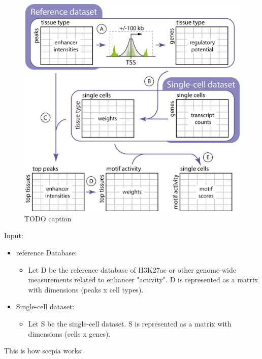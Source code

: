 \begin{figure}
    \centering
    \includegraphics[width=1\linewidth]{ch.scepia/imgs/overview.png}
    \caption{TODO caption}
    \label{fig:enter-label}
\end{figure}

\noindent
Input:

\begin{itemize}
	\item reference Database:
    \begin{itemize}
        \item Let D be the reference database of H3K27ac or other genome-wide measurements related to enhancer "activity". D is represented as a matrix with dimensions (peaks x cell types).
    \end{itemize}
	\item Single-cell dataset:
    \begin{itemize}
        \item Let S be the single-cell dataset. S is represented as a matrix with dimensions (cells x genes).
    \end{itemize}
\end{itemize}


\noindent
This is how scepia works:

